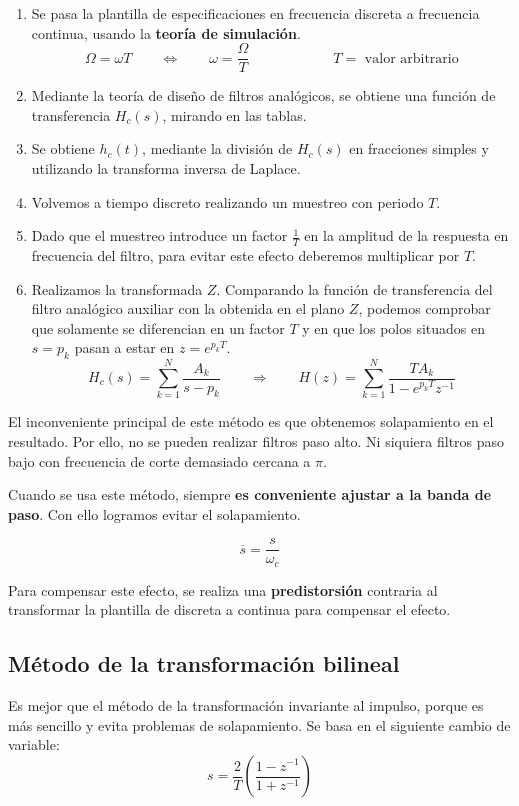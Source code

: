 \documentclass[a4paper,oneside]{book}
\begin{document}
\begin{enumerate}
	 \item Se pasa la plantilla de especificaciones en frecuencia discreta a frecuencia continua, usando la \textbf{teoría de simulación}. 
	 \[ \Omega = \omega T \qquad \Longleftrightarrow \qquad \omega = \frac{\Omega}{T} \qquad \qquad \qquad T = \text{ valor arbitrario}  \]
	 \item Mediante la teoría de diseño de filtros analógicos, se obtiene una función de transferencia $H_c(s)$, mirando en las tablas.
	 \item Se obtiene $h_c(t)$, mediante la división de $H_c(s)$ en fracciones simples y utilizando la transforma inversa de Laplace.
	 \item Volvemos a tiempo discreto realizando un muestreo con periodo $T$.
	 \item Dado que el muestreo introduce un factor $\frac{1}{T}$ en la amplitud de la respuesta en frecuencia del filtro, para evitar este efecto deberemos multiplicar por $T$.
	 \item Realizamos la transformada $Z$. Comparando la función de transferencia del filtro analógico auxiliar con la obtenida en el plano $Z$, podemos comprobar que solamente se diferencian en un factor $T$ y en que los polos situados en $s=p_k$ pasan a estar en $z=e^{p_kT}$. \[ H_c(s) = \sum_{k=1}^{N}\frac{A_k}{s-p_k} \qquad \Longrightarrow \qquad H(z) = \sum_{k=1}^{N} \frac{TA_k}{1 - e^{p_kT}z^{-1}} \]
\end{enumerate}

El inconveniente principal de este método es que obtenemos solapamiento en el resultado. Por ello, no se pueden realizar filtros paso alto. Ni siquiera filtros paso bajo con frecuencia de corte demasiado cercana a $\pi$.

Cuando se usa este método, siempre \textbf{es conveniente ajustar a la banda de paso}. Con ello logramos evitar el solapamiento.

\[ \overline{s} = \frac{s}{\omega_c} \]

Para compensar este efecto, se realiza una \textbf{predistorsión} contraria al transformar la plantilla de discreta a continua para compensar el efecto.

\subsection{Método de la transformación bilineal}

Es mejor que el método de la transformación invariante al impulso, porque es más sencillo y evita problemas de solapamiento. Se basa en el siguiente cambio de variable:
\[ s = \frac{2}{T} \left( \frac{1 - z^{-1}}{1 + z^{-1}} \right) \]
\end{document}
